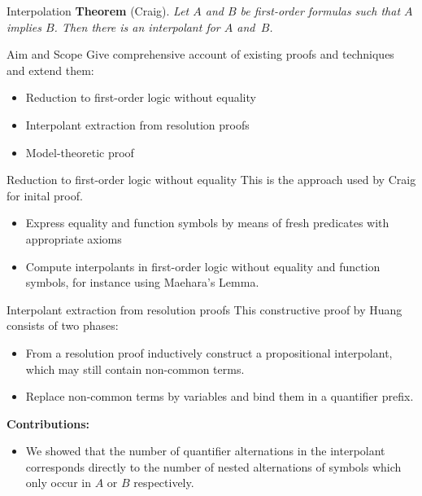 \documentclass[final,hyperref={pdfpagelabels=true}]{beamer}
\newcommand{\contrib}[1]{{\color{TuWienBlue}\textbf{#1}}}
\begin{document}
\begin{frame}
\begin{columns}[t]
\begin{column}{\mycolwidth}
\begin{block}{Interpolation}
				\textbf{Theorem} (Craig).
				\emph{Let $A$ and $B$ be first-order formulas such that $A$ implies $B$.
					Then there is an interpolant for $A$ and~$B$.}
			

			\end{block}


			\begin{block}{Aim and Scope}
				Give comprehensive account of existing proofs and techniques and extend them:
				\begin{itemize}
					\item Reduction to first-order logic without equality
					\item Interpolant extraction from resolution proofs
					\item Model-theoretic proof 
				\end{itemize}
			\end{block}

			\begin{block}{Reduction to first-order logic without equality}
				This is the approach used by Craig for inital proof.
				\begin{itemize}
					\item Express equality and function symbols by means of fresh predicates with appropriate axioms
					\item Compute interpolants in first-order logic without equality and function symbols, for instance using Maehara's Lemma.
				\end{itemize}
			\end{block}

			\begin{block}{Interpolant extraction from resolution proofs}
				This constructive proof by Huang consists of two phases:

				\begin{itemize}
					\item From a resolution proof inductively construct a propositional interpolant, which may still contain non-common terms.
					\item Replace non-common terms by variables and bind them in a quantifier prefix.
				\end{itemize}

				\contrib{Contributions:}
				\begin{itemize}
					\item We showed that the number of quantifier alternations in the interpolant corresponds directly to the number of nested alternations of symbols which only occur in $A$ or $B$ respectively.


\end{itemize}
\end{block}
\end{column}
\end{columns}
\end{frame}
\end{document}
